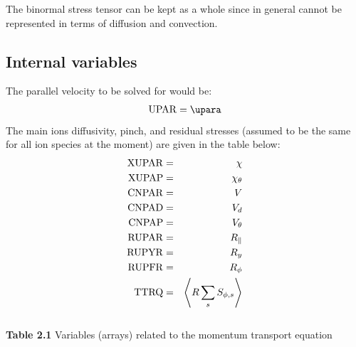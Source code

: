 The binormal stress tensor can be kept as a whole since in general cannot be represented in terms of diffusion and convection.
%
\subsection{Internal variables}
The parallel velocity to be solved for would be:
\begin{eqnarray}
{\rm UPAR} = \upara
\label{upardefastra}
\end{eqnarray}
The main ions diffusivity, pinch, and residual stresses (assumed to be the same for all ion species at the moment) are
given in the table below:
\begin{eqnarray}
{\rm XUPAR} &=& \chi \nonumber \\
{\rm XUPAP} &=& \chi_\theta \nonumber \\
{\rm CNPAR} &=& V \nonumber \\
{\rm CNPAD} &=& V_d \nonumber \\
{\rm CNPAP} &=& V_\theta \nonumber \\
{\rm RUPAR} &=& R_{\parallel} \nonumber \\
{\rm RUPYR} &=& R_y  \nonumber \\
{\rm RUPFR} &=& R_{\phi} \nonumber \\
{\rm TTRQ} &=& \left\langle R \sum_s S_{\phi,s}\right\rangle
\label{turbstuffdefastra}
\end{eqnarray}
\\
{\bf Table 2.1} Variables (arrays) related to the momentum transport equation\\[2ex]
